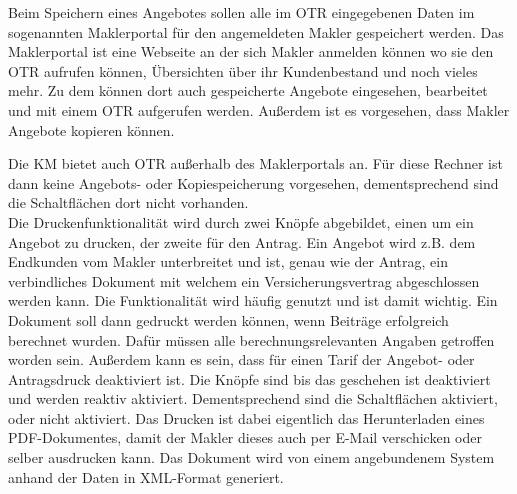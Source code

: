 Beim Speichern eines Angebotes sollen alle im \ac{OTR} eingegebenen Daten im sogenannten Maklerportal für den angemeldeten Makler gespeichert werden. Das Maklerportal ist eine Webseite an der sich Makler anmelden können wo sie den \ac{OTR} aufrufen können, Übersichten über ihr Kundenbestand und noch vieles mehr. Zu dem können dort auch gespeicherte Angebote eingesehen, bearbeitet und mit einem \ac{OTR} aufgerufen werden. 
Außerdem ist es vorgesehen, dass Makler Angebote kopieren können.
\begin{comment}
	In Implementierung verlagern
	
	Beim Speichern wird über mehrere anliegende Systeme ein Angebot in einer Datenbank gespeichert. Wichtig ist dabei die Session, welche von einem der Systeme generiert wird, realisiert als \ac{GUID}. Mithilfe dieser wird ein Angebot im XML-Format in einer Datenbank gespeichert und ist dadurch eindeutig identifizierbar.\\
	
	Dies beinhaltet die gleiche Logik wie die Angebotsspeicherung, bis auf dass eine neue \ac{GUID} erzeugt wird, wodurch dementsprechend ein neuer Eintrag in der Datenbank und im Maklerportal hinterlegt wird. Außerdem muss mit der \ac{GUID}, bzw. Session der Kopie weitergearbeitet werden.\\
\end{comment} 
Die \ac{KM} bietet auch \ac{OTR} außerhalb des Maklerportals an. Für diese Rechner ist dann keine Angebots- oder Kopiespeicherung vorgesehen, dementsprechend sind die Schaltflächen dort nicht vorhanden. \\

Die Druckenfunktionalität wird durch zwei Knöpfe abgebildet, einen um ein Angebot zu drucken, der zweite für den Antrag. Ein Angebot wird z.B. dem Endkunden vom Makler unterbreitet und ist, genau wie der Antrag, ein verbindliches Dokument mit welchem ein Versicherungsvertrag abgeschlossen werden kann. Die Funktionalität wird häufig genutzt und ist damit wichtig. Ein Dokument soll dann gedruckt werden können, wenn Beiträge erfolgreich berechnet wurden. Dafür müssen alle berechnungsrelevanten Angaben getroffen worden sein. Außerdem kann es sein, dass für einen Tarif der Angebot- oder Antragsdruck deaktiviert ist.
 Die Knöpfe sind bis das geschehen ist deaktiviert und werden reaktiv aktiviert.  Dementsprechend sind die Schaltflächen aktiviert, oder nicht aktiviert. Das Drucken ist dabei eigentlich das Herunterladen eines PDF-Dokumentes, damit der Makler dieses auch per E-Mail verschicken oder selber ausdrucken kann. Das Dokument wird von einem angebundenem System anhand der Daten in XML-Format generiert.

